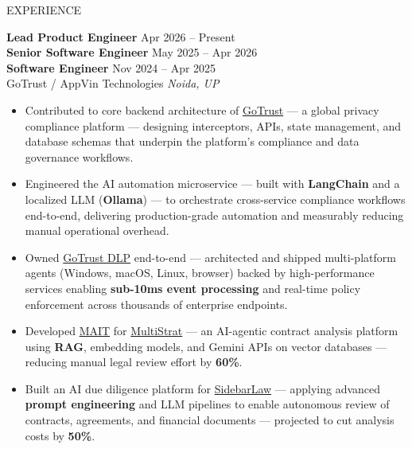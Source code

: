 \documentclass{resume} %
\begin{document}
\begin{rSection}{EXPERIENCE}

\textbf{Lead Product Engineer} \hfill Apr 2026 -- Present\\
\textbf{Senior Software Engineer} \hfill May 2025 -- Apr 2026\\
\textbf{Software Engineer} \hfill Nov 2024 -- Apr 2025\\
GoTrust / AppVin Technologies \hfill \textit{Noida, UP}
\begin{itemize}
    \itemsep -6pt {}

    \item Contributed to core backend architecture of \href{https://www.gotrust.tech/}{GoTrust} — a global privacy compliance platform — designing interceptors, APIs, state management, and database schemas that underpin the platform's compliance and data governance workflows.

    \item Engineered the AI automation microservice — built with \textbf{LangChain} and a localized LLM (\textbf{Ollama}) — to orchestrate cross-service compliance workflows end-to-end, delivering production-grade automation and measurably reducing manual operational overhead.

    \item Owned \href{https://dlp.gotrust.tech/}{GoTrust DLP} end-to-end — architected and shipped multi-platform agents (Windows, macOS, Linux, browser) backed by high-performance services enabling \textbf{sub-10ms event processing} and real-time policy enforcement across thousands of enterprise endpoints.

    \item Developed \href{https://m-ait.com/}{MAIT} for \href{https://multistrat.net/}{MultiStrat} — an AI-agentic contract analysis platform using \textbf{RAG}, embedding models, and Gemini APIs on vector databases — reducing manual legal review effort by \textbf{60\%}.

    \item Built an AI due diligence platform for \href{https://sidebarlaw.in/}{SidebarLaw} — applying advanced \textbf{prompt engineering} and LLM pipelines to enable autonomous review of contracts, agreements, and financial documents — projected to cut analysis costs by \textbf{50\%}.


\end{itemize}
\end{rSection}
\end{document}
